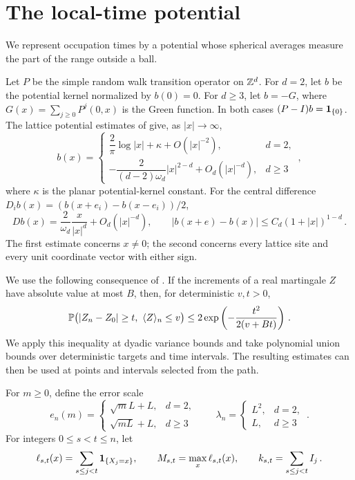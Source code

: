 \section{The local-time potential}\label{sec:local}
We represent occupation times by a potential whose spherical averages
measure the part of the range outside a ball.

Let $P$ be the simple random walk transition operator on $\Z^d$.
For $d=2$, let $b$ be the potential kernel normalized by $b(0)=0$.
For $d\geq3$, let $b=-G$, where
$G(x)=\sum_{j\geq0}P^j(0,x)$ is the Green function.
In both cases $(P-I)b=\ind_{\{0\}}$.
The lattice potential estimates of
\citet[Theorem~4.3.1, Corollary~4.3.3, and Theorem~4.4.4]{LawlerLimic2010}
give, as $|x|\to\infty$,
\begin{equation}\label{eq:kernel-asymptotics}
b(x)=\begin{cases}
\dfrac2\pi\log|x|+\kappa+O(|x|^{-2}),&d=2,\\[3pt]
-\dfrac{2}{(d-2)\omega_d}|x|^{2-d}+O_d(|x|^{-d}),&d\geq3
\end{cases}\, ,
\end{equation}
where $\kappa$ is the planar potential-kernel constant.
For the central difference $D_i b(x)=(b(x+e_i)-b(x-e_i))/2$,
\begin{equation}\label{eq:gradient}
Db(x)=\frac2{\omega_d}\frac{x}{|x|^d}+O_d(|x|^{-d}) ,
\qquad |b(x+e)-b(x)|\leq C_d(1+|x|)^{1-d}\, .
\end{equation}
The first estimate concerns $x\ne0$; the second concerns every lattice
site and every unit coordinate vector with either sign.

We use the following consequence of \citet[Theorem~1.6]{Freedman1975}.
If the increments of a real martingale $Z$ have absolute value at most
$B$, then, for deterministic $v,t>0$,
\begin{equation}\label{eq:freedman}
\P\bigl(|Z_n-Z_0|\geq t,\ \langle Z\rangle_n\leq v\bigr)
\leq2\exp\left(-\frac{t^2}{2(v+Bt)}\right)\, .
\end{equation}
We apply this inequality at dyadic variance bounds and take polynomial
union bounds over deterministic targets and time intervals.
The resulting estimates can then be used at points and intervals
selected from the path.

For $m\geq0$, define the error scale
\begin{equation}\label{eq:error-scale}
e_n(m)=\begin{cases}
\sqrt m L+L,&d=2,\\
\sqrt{mL}+L,&d\geq3
\end{cases}
\qquad
\lambda_n=\begin{cases}L^2,&d=2,\\L,&d\geq3
\end{cases}\, .
\end{equation}
For integers $0\leq s<t\leq n$, let
\begin{equation}\label{eq:interval-def}
\ell_{s,t}(x)=\sum_{s\leq j<t}\ind_{\{X_j=x\}} ,\qquad
M_{s,t}=\max_x\ell_{s,t}(x) ,\qquad
k_{s,t}=\sum_{s\leq j<t}I_j\, .
\end{equation}

